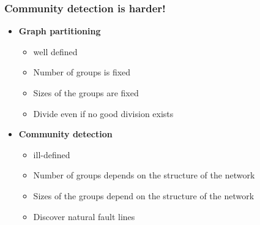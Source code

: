 \documentclass{beamer}
\begin{document}
%
\begin{frame}
    \frametitle{Community detection is harder!}
    \begin{itemize}
        \setlength\itemsep{2em}
        \item{{\bf Graph partitioning}
        \begin{itemize}
        \setlength\itemsep{0.5em}
            \item{\small well defined}
            \item{\small Number of groups is fixed}
            \item{\small Sizes of the groups are fixed}
            \item{\small Divide even if no good division exists}
        \end{itemize}
        }
        \item{{\bf Community detection}
        \begin{itemize}
        \setlength\itemsep{0.5em}
            \item{ill-defined}
            \item{\small Number of groups depends on the structure of the network}
            \item{\small Sizes of the groups depend on the structure of the network}
            \item{\small Discover natural fault lines}
        \end{itemize}
        }
    \end{itemize}
\end{frame}
\end{document}
